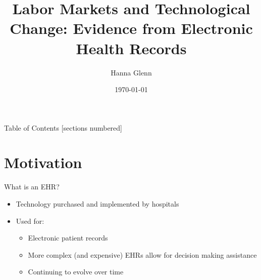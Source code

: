 \documentclass[10pt]{beamer}
\title{Labor Markets and Technological Change: Evidence from Electronic Health Records}
\subtitle{Hanna Glenn}
\date{\today}
\begin{document}
\maketitle


\begin{frame}{Table of Contents}
  [sections numbered]
  \tableofcontents%
\end{frame}

\section[Motivation]{Motivation}

\begin{frame}{What is an EHR?}
\begin{itemize}
    \item Technology purchased and implemented by hospitals
\end{itemize}

\begin{itemize}
    \item Used for:
    \vspace{3mm}
    \begin{itemize}
        \item Electronic patient records
        \vspace{3mm}
        \item More complex (and expensive) EHRs allow for decision making assistance
        \vspace{3mm}
        \item Continuing to evolve over time
    \end{itemize}
\end{itemize}
\end{frame}
\end{document}
